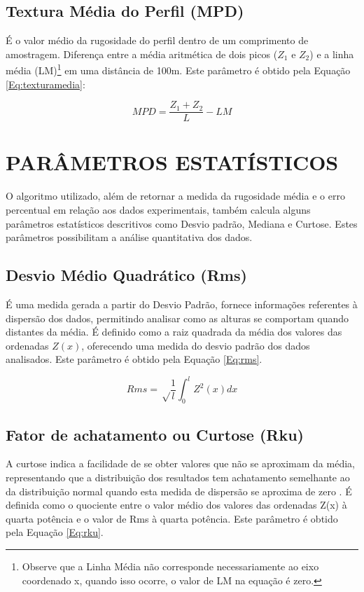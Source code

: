 \subsection{Textura Média do Perfil (MPD)}
É o valor médio da rugosidade do perfil dentro de um comprimento de amostragem. 
Diferença entre a média aritmética de dois picos ($Z_1$ e $Z_2$) e a linha média (LM)\footnote{Observe que a Linha Média não corresponde necessariamente ao eixo coordenado x, quando isso ocorre, o valor de LM na equação é zero.}  em uma distância de 100m. Este parâmetro é obtido pela Equação \ref{Eq:texturamedia}: 

\begin{equation}\label{Eq:texturamedia}
%
MPD = \frac{Z_{1}+Z_{2}}{L} - LM 
%
\end{equation}
%

\section{PARÂMETROS ESTATÍSTICOS
}
O algoritmo utilizado, além de retornar a medida da rugosidade média  e o erro percentual em relação aos dados experimentais, também calcula alguns parâmetros estatísticos descritivos como Desvio padrão, Mediana e Curtose. Estes parâmetros possibilitam a análise quantitativa dos dados.

\subsection{Desvio Médio Quadrático (Rms)}
É uma medida gerada a partir do Desvio Padrão, fornece informações referentes à dispersão dos dados, permitindo analisar  como as alturas se comportam quando distantes da média. É definido como a raiz quadrada da média dos valores das ordenadas $Z(x)$, oferecendo uma medida do desvio padrão dos dados analisados. Este parâmetro é obtido pela Equação \ref{Eq:rms}.

\begin{equation}\label{Eq:rms}
%
Rms = \sqrt\frac{1}{l} \int_0^l Z^2(x)  dx
%
\end{equation}
%

\subsection{Fator de achatamento ou Curtose (Rku)}

A curtose indica a facilidade de se obter valores que não se aproximam da média, representando que a distribuição dos resultados tem achatamento semelhante ao da distribuição normal quando esta medida de dispersão se aproxima de zero \cite{magalhaes}. É definida como o quociente entre o valor médio dos valores das ordenadas Z(x) à quarta potência e o valor de Rms à quarta potência. Este parâmetro é obtido pela Equação \ref{Eq:rku}.

